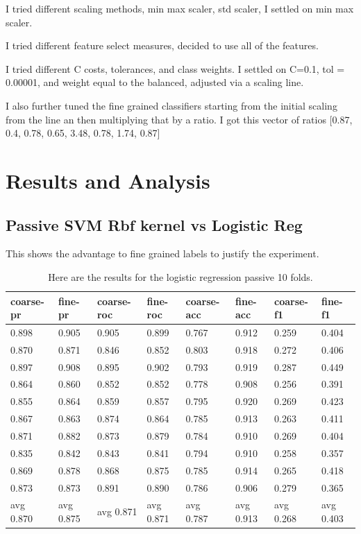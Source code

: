 \documentclass[ms]{nuthesis}
\begin{document}
\par I tried different scaling methods, min max scaler, std scaler, I settled on min max scaler.
\par I tried different feature select measures, decided to use all of the features.
\par I tried different C costs, tolerances, and class weights. I settled on C=0.1, tol = 0.00001,
and weight equal to the balanced, adjusted via a scaling line.
\par I also further tuned the fine grained classifiers starting from the initial scaling from the
line an then multiplying that by a ratio.
I got this vector of ratios
[0.87, 0.4, 0.78, 0.65, 3.48, 0.78, 1.74, 0.87]

\break

\chapter{Results and Analysis}\label{chap:aenied}
\section{Passive SVM Rbf kernel vs Logistic Reg}
\par This shows the advantage to fine grained labels to justify the experiment.
\FloatBarrier
\begin{table}[H]
  \centering
  \begin{tabular}{|l||l||l||l||l||l||l||l|}\toprule
    coarse-pr & fine-pr & coarse-roc & fine-roc & coarse-acc & fine-acc & coarse-f1 & fine-f1 \\ \midrule
    0.898 & 0.905 & 0.905 & 0.899 & 0.767 & 0.912 & 0.259 & 0.404 \\
    0.870 & 0.871 & 0.846 & 0.852 & 0.803 & 0.918 & 0.272 & 0.406 \\
    0.897 & 0.908 & 0.895 & 0.902 & 0.793 & 0.919 & 0.287 & 0.449 \\
    0.864 & 0.860 & 0.852 & 0.852 & 0.778 & 0.908 & 0.256 & 0.391 \\
    0.855 & 0.864 & 0.859 & 0.857 & 0.795 & 0.920 & 0.269 & 0.423 \\
    0.867 & 0.863 & 0.874 & 0.864 & 0.785 & 0.913 & 0.263 & 0.411 \\
    0.871 & 0.882 & 0.873 & 0.879 & 0.784 & 0.910 & 0.269 & 0.404 \\
    0.835 & 0.842 & 0.843 & 0.841 & 0.794 & 0.910 & 0.258 & 0.357 \\
    0.869 & 0.878 & 0.868 & 0.875 & 0.785 & 0.914 & 0.265 & 0.418 \\
    0.873 & 0.873 & 0.891 & 0.890 & 0.786 & 0.906 & 0.279 & 0.365 \\
    avg 0.870 & avg 0.875 & avg 0.871 & avg 0.871 & avg 0.787 & avg 0.913 & avg 0.268 & avg 0.403 \\ \bottomrule
  \end{tabular}
  \caption{Here are the results for the logistic regression passive 10 folds.}
  \label{tab:logReg}
\end{table}
\FloatBarrier
\end{document}
